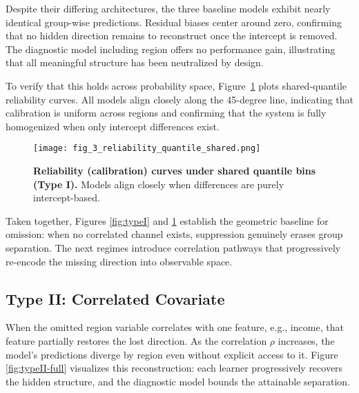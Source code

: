 \documentclass[11pt]{article}
\begin{document}
Despite their differing architectures, the three baseline models
exhibit nearly identical group-wise predictions.
Residual biases center around zero, confirming that no hidden direction
remains to reconstruct once the intercept is removed.
The diagnostic model including region offers no performance gain,
illustrating that all meaningful structure has been neutralized by design.

To verify that this holds across probability space,
Figure~\ref{fig:reliability} plots shared-quantile reliability curves.
All models align closely along the 45-degree line, indicating that
calibration is uniform across regions and confirming that the system
is fully homogenized when only intercept differences exist.

\begin{figure}[H]
  \centering
  \texttt{[image: fig\_3\_reliability\_quantile\_shared.png]}
  \caption{\textbf{Reliability (calibration) curves under shared quantile bins (Type I).} 
  Models align closely when differences are purely intercept-based.}
  \label{fig:reliability}
\end{figure}

Taken together, Figures \ref{fig:typeI} and \ref{fig:reliability}
establish the geometric baseline for omission:
when no correlated channel exists, suppression genuinely erases
group separation.  
The next regimes introduce correlation pathways that progressively
re-encode the missing direction into observable space.

\subsection{Type II: Correlated Covariate}
When the omitted region variable correlates with one feature, e.g., income, that feature partially restores the lost direction.  
As the correlation $\rho$ increases, the model’s predictions diverge by region even without explicit access to it.  
Figure \ref{fig:typeII-full} visualizes this reconstruction: each learner progressively recovers the hidden structure, and the diagnostic model bounds the attainable separation.
\end{document}
